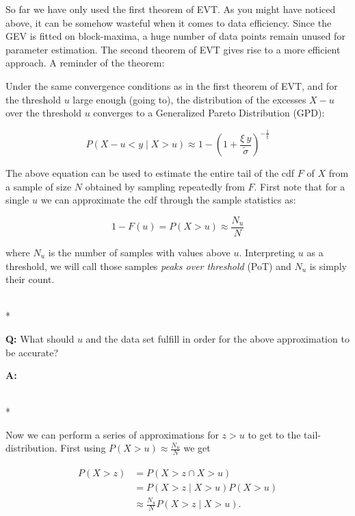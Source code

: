 So far we have only used the first theorem of EVT. As you might have noticed
above, it can be somehow wasteful when it comes to data efficiency. Since the
GEV is fitted on block-maxima, a huge number of data points remain unused for
parameter estimation. The second theorem of EVT gives rise to a more efficient
approach. A reminder of the theorem:

Under the same convergence conditions as in the first theorem of EVT, and
for the threshold $u$ large enough (going to), the distribution of the excesses $X-u$ over
the threshold $u$ converges to a Generalized Pareto Distribution (GPD):

\begin{equation}
    P(X-u < y \mid X > u) \approx 1 - \left( 1 + \frac{\xi \ y}{\tilde{\sigma}} \right)^{-\frac{1}{\xi}}
\end{equation}

The above equation can be used to estimate the entire tail of the cdf $F$ of $X$
from a sample of size $N$ obtained by sampling repeatedly from $F$. First note
that for a single $u$ we can approximate the cdf through the sample statistics
as:


\begin{equation}
1-F(u) = P(X>u) \approx \frac{N_u}{N}
\end{equation}


where $N_u$ is the number of samples with values above $u$. Interpreting $u$ as
a threshold, we will call those samples \textit{peaks over threshold} (PoT) and
$N_u$ is simply their count.

\hrulefill\\*

\textbf{Q:} What should $u$ and the data set fulfill in order for the above
approximation to be accurate?

\textbf{A:} 

\hrulefill\\*

Now we can perform a series of approximations for $z>u$ to get to the
tail-distribution. First using $P(X>u) \approx \frac{N_u}{N}$ we get


\begin{align}
    \begin{split}
        P(X>z) &= P(X>z \cap X>u)  \\
        &= P(X>z \mid X>u) P(X>u)  \\
        &\approx \frac{N_u}{N} P(X>z \mid X>u).   
    \end{split}
\end{align}


